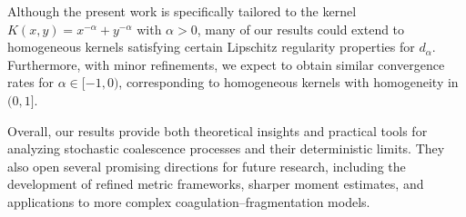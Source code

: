 \documentclass[11pt,a4paper]{article}
\newcommand{\RR}{\mathbb{R}}
\newcommand{\red}[1]{\textcolor{red}{#1}}
\newtheorem{lemma}[theorem]{Lemma}
\begin{document}
Although the present work is specifically tailored to the kernel $K(x,y) = x^{-\alpha} + y^{-\alpha}$ with $\alpha > 0$, many of our results could extend to homogeneous kernels satisfying certain Lipschitz regularity properties for $d_\alpha$. Furthermore, with minor refinements, we expect to obtain similar convergence rates for $\alpha \in [-1,0)$, corresponding to homogeneous kernels with homogeneity in $(0,1]$.

Overall, our results provide both theoretical insights and practical tools for analyzing stochastic coalescence processes and their deterministic limits. They also open several promising directions for future research, including the development of refined metric frameworks, sharper moment estimates, and applications to more complex coagulation–fragmentation models.

\appendix

    
\end{document}
